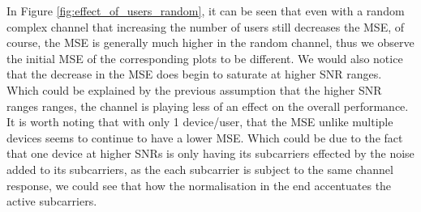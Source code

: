 \documentclass{article}
\begin{document}
In Figure \ref{fig:effect_of_users_random}, it can be seen that even with a random complex channel that increasing the number of users still decreases the MSE, of course, the MSE is generally much higher in the random channel, thus we observe the initial MSE of the corresponding plots to be different. We would also notice that the decrease in the MSE does begin to saturate at higher SNR ranges. Which could be explained by the previous assumption that the higher SNR ranges ranges, the channel is playing less of an effect on the overall performance. It is worth noting that with only 1 device/user, that the MSE unlike multiple devices seems to continue to have a lower MSE. Which could be due to the fact that one device at higher SNRs is only having its subcarriers effected by the noise added to its subcarriers, as the each subcarrier is subject to the same channel response, we could see that how the normalisation in the end accentuates the active subcarriers. 
\end{document}
